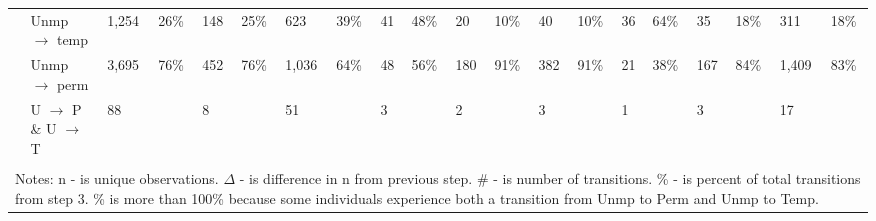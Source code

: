 \begin{tabular}{l>{\raggedright\arraybackslash}p{2in}llllllllllllllllll}
 & Unmp $\rightarrow$ temp & 1,254 & 26\% & 148 & 25\% & 623 & 39\% & 41 & 48\% & 20 & 10\% & 40 & 10\% & 36 & 64\% & 35 & 18\% & 311 & 18\% \\ 
   & Unmp $\rightarrow$ perm & 3,695 & 76\% & 452 & 76\% & 1,036 & 64\% & 48 & 56\% & 180 & 91\% & 382 & 91\% & 21 & 38\% & 167 & 84\% & 1,409 & 83\% \\ 
   & U $\rightarrow$ P \& U $\rightarrow$ T & 88 &  & 8 &  & 51 &  & 3 &  & 2 &  & 3 &  & 1 &  & 3 &  & 17 &  \\ 
   \hline \\[-1.8ex] \multicolumn{20}{p{12in}}{Notes: n - is unique observations.  
               $\Delta$ - is difference in n from previous step.  
               \# - is number of transitions.  
               \% - is percent of total transitions from step 3. 
               \% is more than 100\% because some individuals experience both a transition from Unmp to Perm and Unmp to Temp.} 
\end{tabular}
